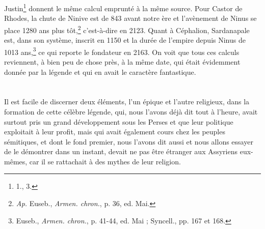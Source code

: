 \documentclass[a4paper, 11pt, oneside, landscape]{article}
\begin{document}
Justin\footnote{1., 3.} donnent le même calcul emprunté à la même source. Pour Castor de Rhodes, la chute de Ninive est de 843 avant notre ère et l'avènement de Ninus se place 1280 ans plus tôt,\footnote{\emph{Ap.} Euseb., \emph{Armen. chron.}, p. 36, ed. Mai.} c'est-à-dire en 2123. Quant à Céphalion, Sardanapale est, dans son système, inscrit en 1150 et la durée de l'empire depuis Ninus de 1013 ans,\footnote{Euseb., \emph{Armen. chron.}, p. 41-44, ed. Mai ; Syncell., pp. 167 et 168.} ce qui reporte le fondateur en 2163. On voit que tous ces calculs reviennent, à bien peu de chose près, à la même date, qui était évidemment donnée par la légende et qui en avait le caractère fantastique.

\bigskip \centerline{\EightStarTaper} \centerline{\EightStarTaper\EightStarTaper} \bigskip\clearpage
\section{}
\paragraph{}
Il est facile de discerner deux éléments, l'un épique et l'autre religieux, dans la formation de cette célèbre légende, qui, nous l'avons déjà dit tout à l'heure, avait surtout pris un grand développement sous les Perses et que leur politique exploitait à leur profit, mais qui avait également cours chez les peuples sémitiques, et dont le fond premier, nous l'avons dit aussi et nous allons essayer de le démontrer dans un instant, devait ne pas être étranger aux Assyriens eux-mêmes, car il se rattachait à des mythes de leur religion.
\end{document}
